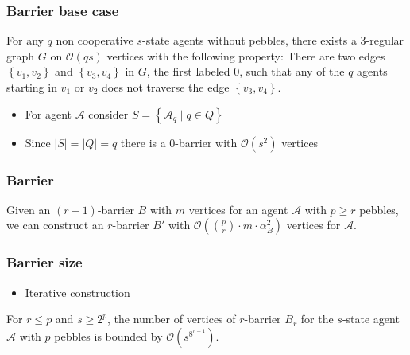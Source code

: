 \documentclass{beamer}
\begin{document}
\begin{frame}
  \frametitle{Barrier base case}
  \begin{theorem}
    For any $q$ non cooperative $s$-state agents without pebbles, there
    exists a 3-regular graph $G$ on $\mathcal{O}(qs)$ vertices with the
    following property: There are two edges $\left\{v_{1},v_{2}\right\}$
    and $\left\{v_{3},v_{4}\right\}$ in $G$, the first labeled 0, such
    that any of the $q$ agents starting in $v_{1}$ or $v_{2}$ does not
    traverse the edge $\left\{v_{3},v_{4}\right\}$.
  \end{theorem}
  \begin{itemize}
    \item For agent $\mathcal{A}$ consider
      $S = \left\{\mathcal{A}_{q}\mid q\in Q\right\}$
    \item Since $|S| = |Q| = q$ there is a 0-barrier with $\mathcal{O}(s^{2})$
      vertices
  \end{itemize}
\end{frame}

\begin{frame}
  \frametitle{Barrier}
  \begin{theorem}
    Given an $(r-1)$-barrier $B$ with $m$ vertices for an agent $\mathcal{A}$
    with $p\geq r$ pebbles, we can construct an $r$-barrier $B'$ with
    $\mathcal{O}(\binom{p}{r}\cdot m\cdot\alpha_{B}^{2})$ vertices for
    $\mathcal{A}$.
  \end{theorem}
  \begin{center}
    \resizebox{0.7\textwidth}{!}{}
  \end{center}
\end{frame}

\begin{frame}
  \frametitle{Barrier size}
  \begin{itemize}
    \item Iterative construction
  \end{itemize}
  \begin{center}
    \resizebox{0.8\textwidth}{!}{}
  \end{center}
  \begin{theorem}
    For $r\leq p$ and $s\geq 2^{p}$, the number of vertices of $r$-barrier
    $B_{r}$ for the $s$-state agent $\mathcal{A}$ with $p$ pebbles is bounded
    by $\mathcal{O}(s^{8^{r+1}})$.
  \end{theorem}
\end{frame}
\end{document}
